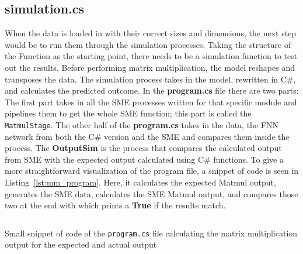 \subsection{simulation.cs}
When the data is loaded in with their correct sizes and dimensions, the next step would be to run them through the simulation processes.
Taking the structure of the  Function as the starting point, there needs to be a simulation function to test out the results.
Before performing matrix multiplication, the model reshapes and transposes the data. The simulation process takes in the model, rewritten in C\#, and calculates the predicted outcome. In the \textbf{program.cs} file there are two parts:
The first part takes in all the SME processes written for that specific module and pipelines them to get the whole SME  function; this part is called the \texttt{MatmulStage}. The other half of the \textbf{program.cs} takes in the data, the FNN network from both the C\# version and the SME and compares them inside the  process. 
The \textbf{OutputSim} is the process that compares the calculated output from SME with the expected output calculated using C\# functions.
To give a more straightforward visualization of the program file, a snippet of code is seen in Listing~\ref{lst:mm_program}.
Here, it calculates the expected Matmul output, generates the SME data, calculates the SME Matmul output, and compares those two at the end with  which prints a \textbf{True} if the results match.\\


\begin{listing}
  \inputminted{csharp}{codesnippets/matmul_program.cs}
  \caption{Small snippet of code of the \texttt{program.cs} file calculating the matrix multiplication output for the expected and actual output}
  \label{lst:mm_program}
\end{listing} 




